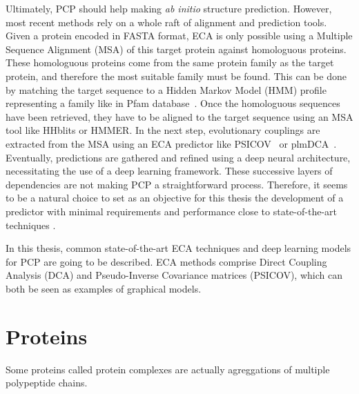     Ultimately, PCP should help making \textit{ab initio} structure prediction.
    However, most recent methods rely on a whole raft of alignment and prediction tools.
    Given a protein encoded in FASTA format, ECA is only possible using a Multiple Sequence Alignment (MSA)
    of this target protein against homologuous proteins. These homologuous proteins come from the same protein family
    as the target protein, and therefore the most suitable family must be found.
    This can be done by matching the target sequence to a Hidden Markov Model (HMM) profile representing a family
    like in Pfam database~\cite{Pfam}. Once the homologuous sequences have been retrieved, they have to be aligned to
    the target sequence using an MSA tool like HHblits or HMMER. In the next step, evolutionary couplings are extracted from
    the MSA using an ECA predictor like PSICOV~\cite{doi:10.1093/bioinformatics/btr638} or plmDCA~\cite{EKEBERG2014341}.
    Eventually, predictions are gathered and refined using a deep neural architecture, necessitating the use
    of a deep learning framework. These successive layers of dependencies are not making PCP a straightforward process.
    Therefore, it seems to be a natural choice to set as an objective for this thesis the development of a predictor with
    minimal requirements and performance close to state-of-the-art techniques
    \cite{RaptorX, DeepContact, doi:10.1093/bioinformatics/bty341, doi:10.1093/bioinformatics/bty341, Michel383133, DeepMind}.

    In this thesis, common state-of-the-art ECA techniques and deep learning models for PCP are going to be described.
    ECA methods comprise Direct Coupling Analysis (DCA) and Pseudo-Inverse Covariance matrices (PSICOV), which can
    both be seen as examples of graphical models. 


    \section{Proteins}

        Some proteins called protein complexes are actually agreggations of multiple polypeptide chains.
        \todo{}
